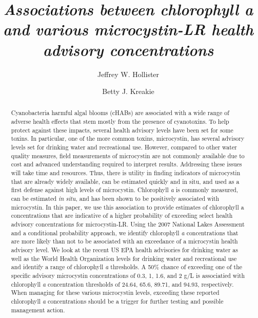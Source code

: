 \documentclass[10pt,a4paper,twocolumn]{article}
\begin{document}
\title{\textit{Associations between chlorophyll \emph{a} and various microcystin-LR
health advisory concentrations} }
\author[1]{Jeffrey W. Hollister}
\author[1]{Betty J. Kreakie}
\affil[1]{}

\maketitle
\thispagestyle{fancy}

\begin{abstract}

Cyanobacteria harmful algal blooms (cHABs) are associated with a wide
range of adverse health effects that stem mostly from the presence of
cyanotoxins. To help protect against these impacts, several health
advisory levels have been set for some toxins. In particular, one of the
more common toxins, microcystin, has several advisory levels set for
drinking water and recreational use. However, compared to other water
quality measures, field measurements of microcystin are not commonly
available due to cost and advanced understanding required to interpret
results. Addressing these issues will take time and resources. Thus,
there is utility in finding indicators of microcystin that are already
widely available, can be estimated quickly and in situ, and used as a
first defense against high levels of microcystin. Chlorophyll \emph{a}
is commonly measured, can be estimated \emph{in situ}, and has been
shown to be positively associated with microcystin. In this paper, we
use this association to provide estimates of chlorophyll a
concentrations that are indicative of a higher probability of exceeding
select health advisory concentrations for microcystin-LR. Using the 2007
National Lakes Assessment and a conditional probability approach, we
identify chlorophyll \emph{a} concentrations that are more likely than
not to be associated with an exceedance of a microcystin health advisory
level. We look at the recent US EPA health advisories for drinking water
as well as the World Health Organization levels for drinking water and
recreational use and identify a range of chlorophyll \emph{a}
thresholds. A 50\% chance of exceeding one of the specific advisory
microcystin concentrations of 0.3, 1, 1.6, and 2 g/L is associatied with
chlorophyll \emph{a} concentration thresholds of 24.64, 65.6, 89.71, and
94.93, respectively. When managing for these various microcystin levels,
exceeding these reported chlorophyll \emph{a} concentrations should be a
trigger for further testing and possible management action.

\end{abstract}
\end{document}
